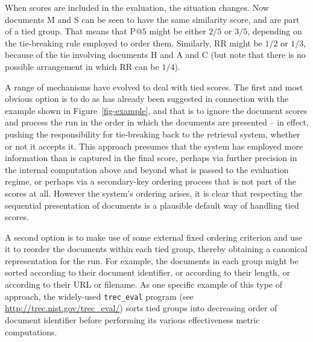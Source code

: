 When scores are included in the evaluation, the situation changes.
Now documents M and S can be seen to have the same similarity score,
and are part of a tied group.
That means that P@$5$ might be either $2/5$ or $3/5$, depending on
the tie-breaking rule employed to order them.
Similarly, RR might be $1/2$ or $1/3$, because of the tie involving
documents H and A and C (but note that there is no
possible arrangement in which RR can be $1/4$).


A range of mechanisms have evolved to deal with tied scores.
The first and most obvious option is to do as has already been
suggested in connection with the example shown in
Figure~\ref{fig-example}, and that is to ignore the document scores
and process the run in the order in which the documents are presented
-- in effect, pushing the responsibility for tie-breaking back to the
retrieval system, whether or not it accepts it.
This approach presumes that the system has employed more information
than is captured in the final score, perhaps via further precision in
the internal computation above and beyond what is passed to the
evaluation regime, or perhaps via a secondary-key ordering process
that is not part of the scores at all.
However the system's ordering arises, it is clear that respecting the
sequential presentation of documents is a plausible default way of
handling tied scores.


A second option is to make use of some external fixed ordering
criterion and use it to reorder the documents within each tied group,
thereby obtaining a canonical representation for the run.
For example, the documents in each group might be sorted according to
their document identifier, or according to their length, or according
to their URL or filename.
As one specific example of this type of approach, the widely-used
{\tt{trec\_eval}} program (see
{\small\url{http://trec.nist.gov/trec_eval/}}) sorts tied groups into
decreasing order of document identifier before performing its various
effectiveness metric computations.


